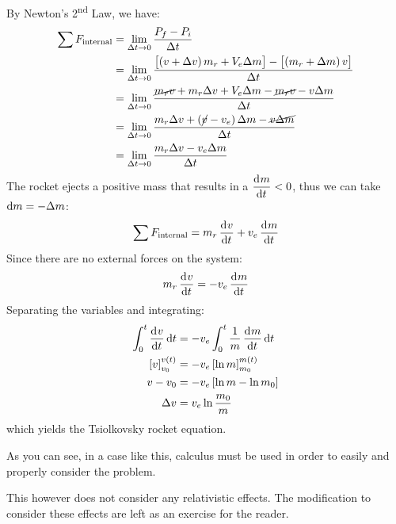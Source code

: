 \documentclass[answers]{exam}
\begin{document}
\begin{questions}
{\begin{solution}
			By Newton's 2\textsuperscript{nd} Law, we have:
			\begin{align*}
				\sum F_\text{internal} &= \lim_{\Delta t \to 0} \frac{P_f - P_i}{\Delta t} \\
				& = \lim_{\Delta t \to 0}\frac{\left[\left(v + \Delta v\right)m_r + V_e \Delta m\right] - \left[\left(m_r + \Delta m\right)v\right]}{\Delta t} \\
				& = \lim_{\Delta t \to 0}\frac{\cancel{m_rv} + m_r\Delta v + V_e \Delta m - \cancel{m_rv} - v\Delta m}{\Delta t} \\
				& = \lim_{\Delta t \to 0}\frac{m_r\Delta v + \left(\cancel{v} - v_e\right) \Delta m - \cancel{v\Delta m}}{\Delta t} \\
				& = \lim_{\Delta t \to 0}\frac{m_r\Delta v - v_e\Delta m}{\Delta t} 
			\end{align*}
			The rocket ejects a positive mass that results in a $\dod{m}{t} < 0$, thus we can take $\dif{m} = -\Delta m$:
			\begin{equation}
				\sum F_\text{internal} = m_r \dod{v}{t} + v_e \dod{m}{t}
			\end{equation}
			Since there are no external forces on the system:
			\begin{equation}
				m_r \dod{v}{t} = -v_e \dod{m}{t}
			\end{equation}
			Separating the variables and integrating:
			\begin{align*}
				\int_0^t \dod{v}{t} \dif t &= - v_e \int_0^t \frac{1}{m} \dod{m}{t} \dif{t} \\ 
				\left[v\right]^{v\left(t\right)}_{v_0} &= -v_e\left[\ln{m}\right]^{m\left(t\right)}_{m_0} \\
				v - v_0 &= -v_e\left[\ln m - \ln m_0\right] \\
				\Delta v &= v_e\ln{\frac{m_0}{m}}
			\end{align*}
			which yields the Tsiolkovsky rocket equation.

			As you can see, in a case like this, calculus must be used in order to easily and properly consider the problem.

			This however does not consider any relativistic effects. The modification to consider these effects are left as an exercise for the reader. 
		\end{solution}
	}
\end{questions}
\end{document}
